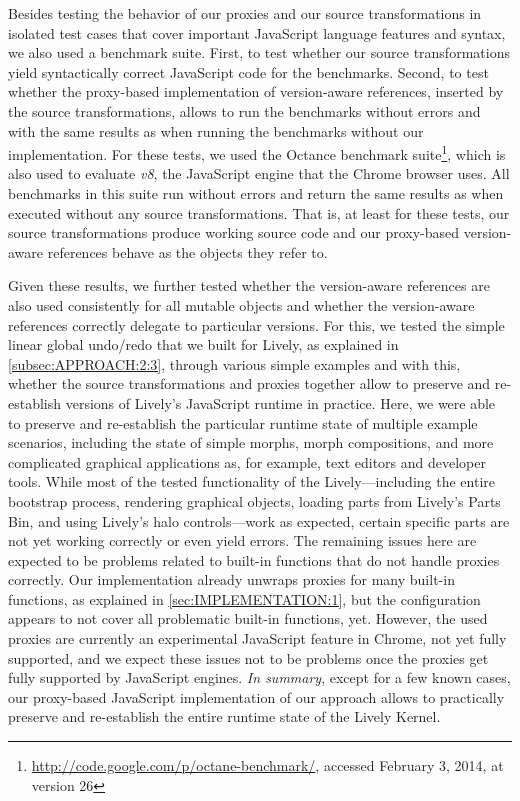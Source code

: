 Besides testing the behavior of our proxies and our source transformations in isolated test cases that cover important JavaScript language features and syntax, we also used a benchmark suite.
First, to test whether our source transformations yield syntactically correct JavaScript code for the benchmarks.
Second, to test whether the proxy-based implementation of version-aware references, inserted by the source transformations, allows to run the benchmarks without errors and with the same results as when running the benchmarks without our implementation.
For these tests, we used the Octance benchmark suite\footnote{\url{http://code.google.com/p/octane-benchmark/}, accessed February 3, 2014, at version 26}, which is also used to evaluate \emph{v8}, the JavaScript engine that the Chrome browser uses.
All benchmarks in this suite run without errors and return the same results as when executed without any source transformations.
That is, at least for these tests, our source transformations produce working source code and our proxy-based version-aware references behave as the objects they refer to.

Given these results, we further tested whether the version-aware references are also used consistently for all mutable objects and whether the version-aware references correctly delegate to particular versions.
For this, we tested the simple linear global undo/redo that we built for Lively, as explained in \ref{subsec:APPROACH:2:3}, through various simple examples and with this, whether the source transformations and proxies together allow to preserve and re-establish versions of Lively's JavaScript runtime in practice.
Here, we were able to preserve and re-establish the particular runtime state of multiple example scenarios, including the state of simple morphs, morph compositions, and more complicated graphical applications as, for example, text editors and developer tools.
While most of the tested functionality of the Lively---including the entire bootstrap process, rendering graphical objects, loading parts from Lively's Parts Bin, and using Lively's halo controls---work as expected, certain specific parts are not yet working correctly or even yield errors.
The remaining issues here are expected to be problems related to built-in functions that do not handle proxies correctly.
Our implementation already unwraps proxies for many built-in functions, as explained in \ref{sec:IMPLEMENTATION:1}, but the configuration appears to not cover all problematic built-in functions, yet.
However, the used proxies are currently an experimental JavaScript feature in Chrome, not yet fully supported, and we expect these issues not to be problems once the proxies get fully supported by JavaScript engines.
\emph{In summary}, except for a few known cases, our proxy-based JavaScript implementation of our approach allows to practically preserve and re-establish the entire runtime state of the Lively Kernel.


